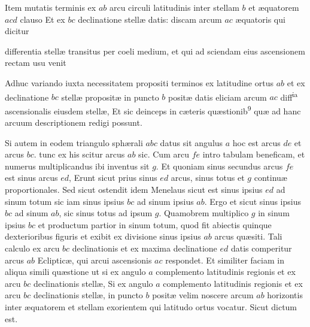 \documentclass[11pt,a4paper]{article}
\begin{document}
Item mutatis terminis ex $ab$ arcu
circuli latitudinis inter stellam $b$ et æquatorem $acd$ clauso Et ex
$bc$ declinatione stellæ datis: discam arcum $ac$ æquatoris qui dicitur

differentia stellæ transitus per coeli medium, et qui ad sciendam
eius ascensionem rectam usu venit

Adhuc variando iuxta necessitatem
propositi terminos ex latitudine ortus $ab$ et ex declinatione
$bc$ stellæ propositæ in puncto $b$ positæ datis eliciam arcum $ac$ diff\textsuperscript{ia}
ascensionalis eiusdem stellæ, Et sic deinceps in cæteris quæstionib\textsuperscript{9}
quæ ad hanc arcuum descriptionem redigi possunt.

Si autem
in eodem triangulo sphærali $abc$ datus sit angulus $a$ hoc est
arcus $de$ et arcus $bc$. tunc ex his scitur arcus $ab$ sic. Cum
arcu $fe$ intro tabulam beneficam, et numerus multiplicandus
ibi inventus sit $g$. Et quoniam sinus secundus arcus $fe$ est sinus
arcus $ed$, Erunt sicut prius sinus $ed$ arcus, sinus totus et $g$
continuæ proportionales. Sed sicut ostendit idem Menelaus
sicut est sinus ipsius $ed$ ad sinum totum sic iam sinus ipsius $bc$
ad sinum ipsius $ab$. Ergo et sicut sinus ipsius $bc$ ad sinum
$ab$, sic sinus totus ad ipsum $g$. Quamobrem multiplico $g$ in
sinum ipsius $bc$ et productum partior in sinum totum, quod
fit abiectis quinque dexterioribus figuris et exibit ex divisione
sinus ipsius $ab$ arcus quæsiti. Tali calculo ex arcu $bc$ declinationis
et ex maxima declinatione $ed$ datis comperitur arcus $ab$
Eclipticæ, qui arcui ascensionis $ac$ respondet. Et similiter
faciam in aliqua simili quæstione ut si ex angulo $a$ complemento
latitudinis regionis et ex arcu $bc$ declinationis stellæ,
Si ex angulo $a$ complemento latitudinis regionis et ex arcu
$bc$ declinationis stellæ, in puncto $b$ positæ velim noscere
arcum $ab$ horizontis inter æquatorem et stellam exorientem
qui latitudo ortus vocatur. Sicut dictum est.
\end{document}

